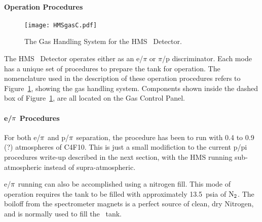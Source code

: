 \paragraph{Operation Procedures}

\begin{figure}
\texttt{[image: HMSgasC.pdf]}
\caption{The Gas Handling System for the HMS \Cerenkov\ Detector. \label{fig:gas}}
\end{figure}

The HMS \Cerenkov\ Detector operates either as an e/$\pi$ or $\pi$/p
discriminator. Each mode has a unique set of procedures to prepare the tank
for operation. The nomenclature used in the description of these operation
procedures refers to Figure~\ref{fig:gas}, showing the gas handling system. Components 
shown
inside the dashed box of Figure~\ref{fig:gas}, are all located on the Gas Control Panel.

\paragraph{e/$\bf{\pi}$ Procedures}
For both e/$\bf{\pi}$ and p/$\bf{\pi}$ separation, the procedure 
has been to run with 0.4 to
0.9 (?) atmospheres of C4F10.  This is just a small modifiction to the
current p/pi procedures write-up described in the next section,
with the HMS running sub-atmospheric instead of supra-atmospheric. 

e/$\bf{\pi}$ running can also be accomplished using a nitrogen fill.
This mode of operation requires the tank to be filled with approximately
13.5~psia of $\rm{N_2}$.  The boiloff from the spectrometer magnets is a
perfect source of clean, dry Nitrogen, and is normally used to fill the
\Cerenkov\ tank.

